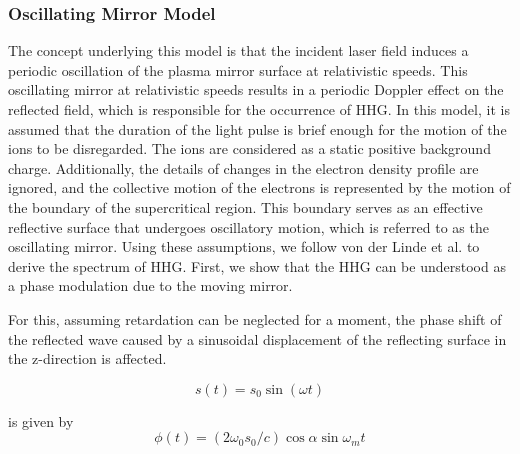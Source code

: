 \subsubsection{Oscillating Mirror Model}
The concept underlying this model is that the incident laser field induces a periodic oscillation of the plasma mirror surface at relativistic speeds. This oscillating mirror at relativistic speeds results in a periodic Doppler effect on the reflected field, which is responsible for the occurrence of HHG. In this model, it is assumed that the duration of the light pulse is brief enough for the motion of the ions to be disregarded. The ions are considered as a static positive background charge. Additionally, the details of changes in the electron density profile are ignored, and the collective motion of the electrons is represented by the motion of the boundary of the supercritical region. This boundary serves as an effective reflective surface that undergoes oscillatory motion, which is referred to as the oscillating mirror. Using these assumptions, we follow von der Linde et al.\cite{hhg-main} to derive the spectrum of HHG. First, we show that the HHG can be understood as a phase modulation due to the moving mirror.

For this, assuming retardation can be neglected for a moment, the phase shift of the reflected wave caused by a sinusoidal displacement of the reflecting surface in the z-direction is affected.

\begin{equation*}
    s(t) = s_0 \sin(\omega t)
\end{equation*}

is given by
\begin{equation*}
    \phi(t) = (2\omega_0s_0/c)\cos\alpha \sin \omega_m t
\end{equation*}

